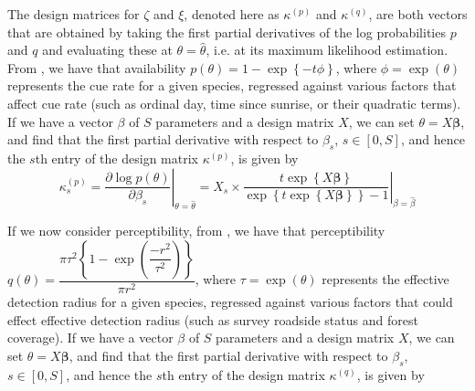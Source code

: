\documentclass[12pt]{article}
\begin{document}
The design matrices for $\zeta$ and $\xi$, denoted here as $\kappa^{(p)}$ and $\kappa^{(q)}$, are both vectors that are obtained by taking the first partial derivatives of the log probabilities $p$ and $q$ and evaluating these at $\theta = \hat{\theta}$, i.e. at its maximum likelihood estimation. From \citet{solymos_calibrating_2013}, we have that availability $p(\theta) = 1 - \exp\left\{-t\phi\right\}$, where $\phi = \exp\left(\theta\right)$ represents the cue rate for a given species, regressed against various factors that affect cue rate (such as ordinal day, time since sunrise, or their quadratic terms). If we have a vector {\boldmath$\beta$} of $S$ parameters and a design matrix $X$, we can set $\theta = X\boldsymbol{\beta}$, and find that the first partial derivative with respect to $\beta_s$, $s \in \left[0, S\right]$, and hence the $s$th entry of the design matrix $\kappa^{(p)}$, is given by
\begin{equation*}\label{kappa_p}
	\kappa_{s}^{(p)} = \left.\dfrac{\partial \log p(\theta)}{\partial \beta_s}\right\vert_{\theta = \hat{\theta}} = \left. X_s \times \dfrac{t \exp\left\{X\boldsymbol{\beta}\right\}}{\exp\left\{t \exp\left\{X\boldsymbol{\beta}\right\}\right\} - 1} \right\vert_{\beta = \hat{\beta}}
\end{equation*}


	
If we now consider perceptibility, from \citet{solymos_calibrating_2013}, we have that perceptibility $q(\theta) = \dfrac{\pi \tau^2 \left\{1 - \exp\left(\dfrac{-r^2}{\tau^2}\right)\right\}}{\pi r^2}$, where $\tau = \exp(\theta)$ represents the effective detection radius for a given species, regressed against various factors that could effect effective detection radius (such as survey roadside status and forest coverage). If we have a vector {\boldmath$\beta$} of $S$ parameters and a design matrix $X$, we can set $\theta = X\boldsymbol{\beta}$, and find that the first partial derivative with respect to $\beta_s$, $s \in \left[0, S\right]$, and hence the $s$th entry of the design matrix $\kappa^{(q)}$, is given by

\end{document}
